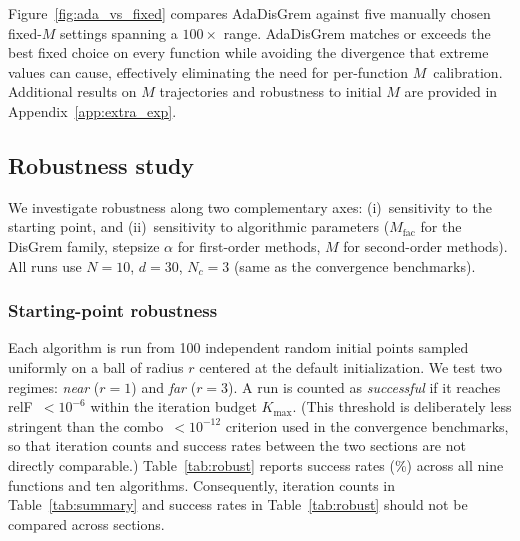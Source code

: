 \documentclass[10pt,twocolumn,letterpaper]{article}
\theoremstyle{compact}
\theoremstyle{compactremark}
\begin{document}
	Figure~\ref{fig:ada_vs_fixed} compares AdaDisGrem against five manually chosen
	fixed-$M$ settings spanning a $100\times$ range.
	AdaDisGrem matches or exceeds the best fixed
	choice on every function while avoiding the divergence that extreme
	values can cause, effectively eliminating the need for per-function
	$M$~calibration.
	Additional results on $M$ trajectories and robustness to initial $M$
	are provided in Appendix~\ref{app:extra_exp}.
	
	\subsection{Robustness study}\label{ssec:robust}
	
	We investigate robustness along two complementary axes:
	(i)~sensitivity to the starting point, and
	(ii)~sensitivity to algorithmic parameters ($M_{\mathrm{fac}}$ for
	the DisGrem family, stepsize $\alpha$ for first-order methods, $M$
	for second-order methods).
	All runs use $N{=}10$, $d{=}30$, $N_c{=}3$ (same as the convergence
	benchmarks).
	
	\subsubsection{Starting-point robustness}
	
	Each algorithm is run from 100 independent random initial points
	sampled uniformly on a ball of radius $r$ centered at the default
	initialization.
	We test two regimes: \textit{near} ($r{=}1$) and \textit{far}
	($r{=}3$).
	A run is counted as \emph{successful} if it reaches relF~$<10^{-6}$
	within the iteration budget $K_{\max}$.
	(This threshold is deliberately less stringent than the combo~$<10^{-12}$
	criterion used in the convergence benchmarks, so that iteration counts
	and success rates between the two sections are not directly comparable.)
	Table~\ref{tab:robust} reports
	success rates (\%) across all nine functions and ten algorithms.
	Consequently, iteration counts in Table~\ref{tab:summary}
	and success rates in Table~\ref{tab:robust}
	should not be compared across sections.
	
\end{document}
